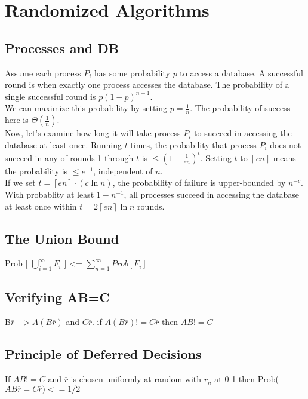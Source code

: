 \section{Randomized Algorithms}

\subsection{Processes and DB}
Assume each process $P_i$ has some probability $p$ to access a database. A successful round is when exactly one process accesses the database. The probability of a single successful round is $p(1 - p)^{n-1}$.\\
We can maximize this probability by setting $p = \frac{1}{n}$. The probability of success here is $\Theta(\frac{1}{n})$.\\
Now, let's examine how long it will take process $P_i$ to succeed in accessing the database at least once. Running $t$ times, the probability that process $P_i$ does not succeed in any of rounds 1 through $t$ is $\leq (1 - \frac{1}{en})^t$. Setting $t$ to $\left\lceil en \right\rceil$ means the probability is $\leq e^{-1}$, independent of $n$.\\
If we set $t = \left\lceil en \right\rceil \cdot (c \ln n)$, the probability of failure is upper-bounded by $n^{-c}$.\\
With probablity at least $1 - n^{-1}$, all processes succeed in accessing the database at least once within $t = 2 \left\lceil en \right\rceil \ln n$ rounds.

\subsection{The Union Bound}
Prob [ $\bigcup\limits_{i=1}^{\infty} F_{i}$ ] <= $\sum_{n=1}^{\infty}  Prob[ F_{i}] $ 


\subsection{Verifying AB=C}

B$\overbar{r} -> A(B\overbar{r})$ and $C\overbar{r}$. if $A(B\overbar{r}) != C\overbar{r}$ then $AB != C$

\subsection{Principle of Deferred Decisions}
If $AB != C$ and $\overbar{r}$ is chosen uniformly at random with $r_n$ at 0-1 then Prob($AB\overbar{r} = C\overbar{r}) <= 1/2$

